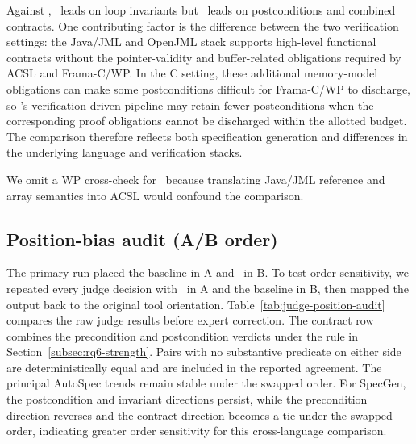 {Against \specgen, \toolname\ leads on loop invariants but \specgen\ leads on postconditions and combined contracts. One contributing factor is the difference between the two verification settings: the Java/JML and OpenJML stack supports high-level functional contracts without the pointer-validity and buffer-related obligations required by ACSL and Frama-C/WP. In the C setting, these additional memory-model obligations can make some postconditions difficult for Frama-C/WP to discharge, so \toolname's verification-driven pipeline may retain fewer postconditions when the corresponding proof obligations cannot be discharged within the allotted budget. The comparison therefore reflects both specification generation and differences in the underlying language and verification stacks.}

{We omit a WP cross-check for \specgen\ because translating Java/JML reference and array semantics into ACSL would confound the comparison.}



\subsection{{Position-bias audit (A/B order)}}
\label{app:judge-audit}

{The primary run placed the baseline in A and \toolname\ in B. To test order sensitivity, we repeated every judge decision with \toolname\ in A and the baseline in B, then mapped the output back to the original tool orientation. Table~\ref{tab:judge-position-audit} compares the raw judge results before expert correction. The contract row combines the precondition and postcondition verdicts under the rule in Section~\ref{subsec:rq6-strength}. Pairs with no substantive predicate on either side are deterministically equal and are included in the reported agreement. The principal AutoSpec trends remain stable under the swapped order. For SpecGen, the postcondition and invariant directions persist, while the precondition direction reverses and the contract direction becomes a tie under the swapped order, indicating greater order sensitivity for this cross-language comparison.}

